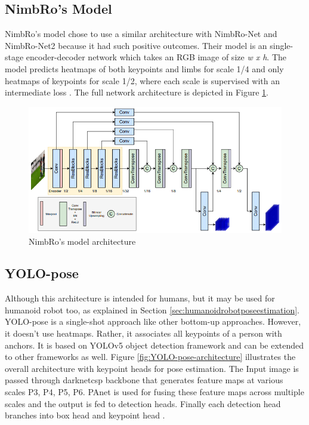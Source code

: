 \subsection{NimbRo's Model}
\label{subsec:nimbromodel}

NimbRo's model chose to use a similar architecture with NimbRo-Net and NimbRo-Net2 because it had such positive outcomes. Their model is an single-stage encoder-decoder network which takes an RGB image of
size \emph{w x h}. The model predicts heatmaps of both keypoints and limbs for scale 1/4 and only
heatmaps of keypoints for scale 1/2, where each scale is supervised with an intermediate loss \parencite{amini2021}. The full network architecture is depicted in Figure \ref{fig:nimbro-model-architecture}.

\begin{figure}[ht]
  \centering
  \includegraphics[scale=0.9]{gambar/nimbro-architecture.png}
  \caption{NimbRo's model architecture}
  \label{fig:nimbro-model-architecture}
\end{figure}

\subsection{YOLO-pose}
\label{subsec:yolopose}

Although this architecture is intended for humans, but it may be used for humanoid robot too, as explained in Section \ref{sec:humanoidrobotposeestimation}.
YOLO-pose is a single-shot approach like other bottom-up approaches. However, it doesn't use heatmaps. Rather, it associates all keypoints of a person with anchors. It is
based on YOLOv5 object detection framework and can be extended to other frameworks as well. Figure \ref{fig:YOLO-pose-architecture} illustrates the overall architecture with keypoint
heads for pose estimation. The Input image is passed through darknetcsp backbone that generates feature maps at
various scales {P3, P4, P5, P6}. PAnet is used for fusing these feature maps across multiple scales and the output is fed to detection
heads. Finally each detection head branches into box head and keypoint head \parencite{maji2022yolopose}.

